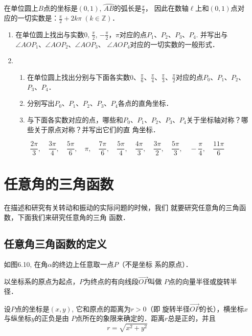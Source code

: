 \begin{solution}
在单位圆上$B$点的坐标是$(0,1)$, $\wideparen{AB}$的弧长是$\frac{\pi}{2}$，
因此在数轴$\ell$上和$(0,1)$点对应的一切实数是：$\frac{\pi}{2}+2k\pi\; (k\in\mathbb{Z})$．

\end{solution}

\begin{ex}
\begin{enumerate}
   \item 在单位圆上找出与实数0, $\frac{\pi}{2}$, $-\frac{\pi}{2}$，$\pi$对应的点$P_1$、$P_2$、$P_3$、$P_4$. 并写出与$\angle AOP_1$、$\angle AOP_2$、$\angle AOP_3$、
$\angle AOP_4$对应的一切实数的一般形式．


\item \begin{enumerate}
\item 在单位圆上找出分别与下面各实数0、$\frac{\pi}{6}$、$\frac{\pi}{4}$、$\frac{\pi}{3}$、$\frac{\pi}{2}$对应的点$P_0$、$P_1$、$P_2$、$P_3$、$P_4$．
\item 分别写出$P_0$、$P_1$、$P_2$、$P_3$、$P_4$各点的直角坐标．
\item 与下面各实数对应的点，哪些和$P_0$、$P_1$、$P_2$、$P_3$、$P_4$关于坐标轴对称？哪些关于原点对称？并写出它们的直
角坐标．
\end{enumerate} 
\end{enumerate}
\[\frac{2\pi}{3},\quad \frac{3\pi}{4},\quad \frac{5\pi}{6},\quad \pi,\quad \frac{7\pi}{6},\quad \frac{5\pi}{4},\quad \frac{4\pi}{3},\quad \frac{3\pi}{2},\quad \frac{5\pi}{3},\quad -\frac{\pi}{4},\quad \frac{11\pi}{6}\]
\end{ex}

\section{任意角的三角函数}
在描述和研究有关转动和振动的实际问题的时候，我们
就要研究任意角的三角函数，下面我们来研究任意角的三角
函数．

\subsection{任意角三角函数的定义}
如图6.10, 在角$\alpha$的终边上任意取一点$P$（不是坐标
系的原点）．

以坐标系的原点为起点，$P$为终点的有向线段$\Vec{OP}$叫做
$P$点的向量半径或旋转半径．

设$P$点的坐标是$(x,y)$, 它和原点的距离为$r>0$（即
旋转半径$\Vec{OP}$的长），横坐标$x$与纵坐标$y$的正负是由
$P$点所在的象限来确定的．距离$r$总是正的，并且
\[r=\sqrt{x^2+y^2}\]

